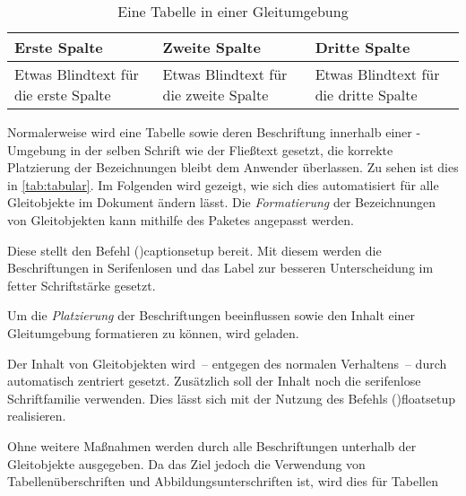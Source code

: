\documentclass[%
  english,ngerman,%
  cdgeometry=no,DIV=12,%
  cd=false,cdfont=false,cdtitle=true,%
  headings=normal,%
  automark,%
  listof=toc,%
]{tudscrartcl}
\begin{document}
\newcommand*\tableexample[1][]{%
  \begin{tabularx}{.75\textwidth}{@{}XXX@{}}
  \toprule
  \textbf{Erste Spalte} & \textbf{Zweite Spalte} & 
  \textbf{Dritte Spalte} \tabularnewline\midrule
  Etwas Blindtext für die erste Spalte &
  Etwas Blindtext für die zweite Spalte &
  Etwas Blindtext für die dritte Spalte
  \tabularnewline\bottomrule
  \end{tabularx}
  #1%
}
\begin{table}
\tableexample[%
  \caption{%
    Eine Tabelle in einer Gleitumgebung%
    \label{tab:tabular}%
  }%
]
\end{table}

Normalerweise wird eine Tabelle sowie deren Beschriftung innerhalb einer 
-Umgebung in der selben Schrift wie der Fließtext 
gesetzt, die korrekte Platzierung der Bezeichnungen bleibt dem Anwender 
überlassen. Zu sehen ist dies in \autoref{tab:tabular}. Im Folgenden wird 
gezeigt, wie sich dies automatisiert für alle Gleitobjekte im Dokument ändern 
lässt. Die \emph{Formatierung} der Bezeichnungen von Gleitobjekten kann 
mithilfe des Paketes  angepasst werden.
%
\begin{Preamble}
\usepackage{caption}
\end{Preamble}
%
Diese stellt den Befehl \Macro(){captionsetup} bereit. Mit 
diesem werden die Beschriftungen in Serifenlosen und das Label zur besseren 
Unterscheidung im fetter Schriftstärke gesetzt.
%
\begin{Preamble*}
\captionsetup{font=sf,labelfont=bf,labelsep=space}
\end{Preamble*}
%
Um die \emph{Platzierung} der Beschriftungen beeinflussen sowie den Inhalt 
einer Gleitumgebung formatieren zu können, wird  geladen. 
\begin{Preamble}
\usepackage{floatrow}
\end{Preamble}
%
Der Inhalt von Gleitobjekten wird~-- entgegen des normalen Verhaltens~-- durch 
 automatisch zentriert gesetzt. Zusätzlich soll der Inhalt 
noch die serifenlose Schriftfamilie verwenden. Dies lässt sich mit der Nutzung 
des Befehls \Macro(){floatsetup} realisieren.
%
\begin{Preamble*}
\end{Preamble*}
%
Ohne weitere Maßnahmen werden durch  alle Beschriftungen 
unterhalb der Gleitobjekte ausgegeben. Da das Ziel jedoch die Verwendung von 
Tabellenüberschriften und Abbildungsunterschriften ist, wird dies für Tabellen
\end{document}
